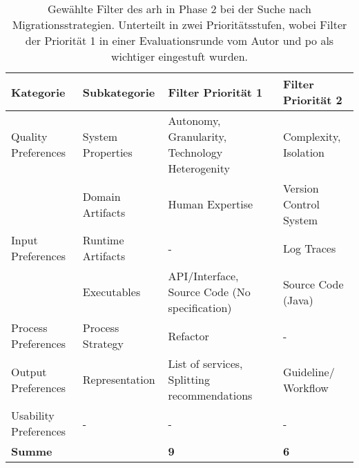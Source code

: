 \begin{table}[!h]
  \centering
  \begin{tabular}{m{3cm} l m{4cm} m{3.5cm}}
    \toprule
    \textbf{Kategorie} & \textbf{Subkategorie} & \textbf{Filter Priorität 1} & \textbf{Filter Priorität 2} \\ \midrule
    Quality Preferences & System Properties & Autonomy, Granularity, Tech\-nology Heterogenity & Complexity, Isolation \\ \hline
    & Domain Artifacts & Human Expertise & Version Control Sys\-tem \\
    Input Preferences & Runtime Artifacts & - & Log Traces \\
     & Executables & API/Interface, Source Code (No specifica\-tion) & Source Code (Java) \\ \hline
    Process Preferences & Process Strategy & Refactor & - \\ \hline
    Output Preferences & Representation & List of services, Split\-ting recommendations & Guideline/ Workflow \\ \hline
    Usability Preferences & - & - & - \\ \midrule
    \multicolumn{2}{l}{\textbf{Summe}} &\textbf{9} & \textbf{6} \\ \bottomrule
  \end{tabular}
  \caption[Gewählte Filter des \acrshort{arh}]{
    Gewählte Filter des \gls{arh} in Phase 2 bei der Suche nach Migrationsstrategien.
    Unterteilt in zwei Prioritätsstufen, wobei Filter der Priorität 1 in einer Evaluationsrunde vom Autor und \gls{po} als wichtiger eingestuft wurden.
  }
  \label{tab:phase2-selected-filter}
\end{table}
